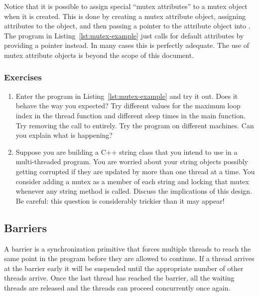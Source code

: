 Notice that it is possible to assign special ``mutex attributes'' to a mutex object when it is
created. This is done by creating a mutex attribute object, assigning attributes to the object,
and then passing a pointer to the attribute object into . The
program in Listing~\ref{lst:mutex-example} just calls for default attributes by providing a
 pointer instead. In many cases this is perfectly adequate. The use of mutex
attribute objects is beyond the scope of this document.

\subsubsection*{Exercises}

\begin{enumerate}
  
\item Enter the program in Listing~\ref{lst:mutex-example} and try it out. Does it behave the
  way you expected? Try different values for the maximum loop index in the thread function and
  different sleep times in the main function. Try removing the call to 
  entirely. Try the program on different machines. Can you explain what is happening?

\item Suppose you are building a C++ string class that you intend to use in a multi-threaded
  program. You are worried about your string objects possibly getting corrupted if they are
  updated by more than one thread at a time. You consider adding a mutex as a member of each
  string and locking that mutex whenever any string method is called. Discuss the implications
  of this design. Be careful: this question is considerably trickier than it may appear!

\end{enumerate}

\subsection{Barriers}
\label{subsec:barriers}

A barrier is a synchronization primitive that forces multiple threads to reach the same point in
the program before they are allowed to continue. If a thread arrives at the barrier early it
will be suspended until the appropriate number of other threads arrive. Once the last thread has
reached the barrier, all the waiting threads are released and the threads can proceed
concurrently once again.

